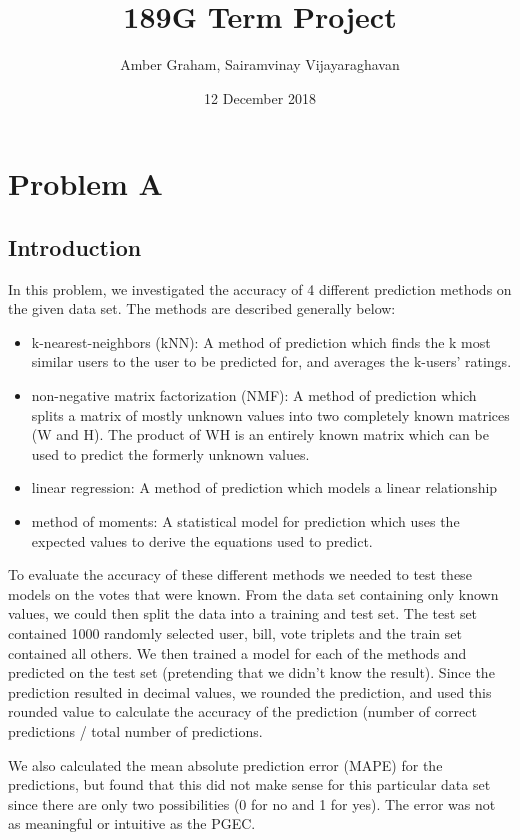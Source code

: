 \documentclass{article}
\title{189G Term Project}
\author{Amber Graham, Sairamvinay Vijayaraghavan}
\date{12 December 2018}
\begin{document}
\maketitle

\section{Problem A}
\subsection{Introduction}

In this problem, we investigated the accuracy of 4 different prediction methods on the given data set. The methods are described generally below:

\begin{itemize}
    \item k-nearest-neighbors (kNN): A method of prediction which finds the k most similar users to the user to be predicted for, and averages the k-users' ratings.
    \item non-negative matrix factorization (NMF): A method of prediction which splits a matrix of mostly unknown values into two completely known matrices (W and H). The product of WH is an entirely known matrix which can be used to predict the formerly unknown values.
    \item linear regression: A method of prediction which models a linear relationship
    \item method of moments: A statistical model for prediction which uses the expected values to derive the equations used to predict.
\end{itemize}

To evaluate the accuracy of these different methods we needed to test these models on the votes that were known. From the data set containing only known values, we could then split the data into a training and test set. The test set contained 1000 randomly selected user, bill, vote triplets and the train set contained all others. We then trained a model for each of the methods and predicted on the test set (pretending that we didn’t know the result).  Since the prediction resulted in decimal values, we rounded the prediction, and used this rounded value to calculate the accuracy of the prediction (number of correct predictions / total number of predictions.

We also calculated the mean absolute prediction error (MAPE) for the predictions, but found that this did not make sense for this particular data set since there are only two possibilities (0 for no and 1 for yes). The error was not as meaningful or intuitive as the PGEC. 
\end{document}
